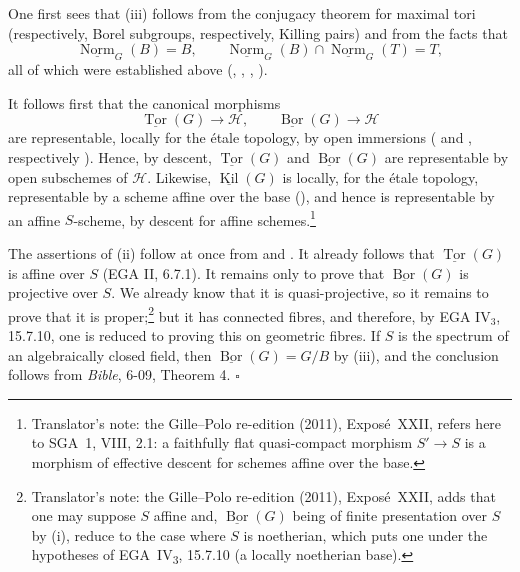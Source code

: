 One first sees that \textup{(iii)} follows from the conjugacy theorem
for maximal tori \textup{(respectively, Borel subgroups, respectively,
Killing pairs)} and from the facts that
\[
  \underline{\operatorname{Norm}}_G(B)=B,
  \qquad
  \underline{\operatorname{Norm}}_G(B)
  \cap
  \underline{\operatorname{Norm}}_G(T)=T,
\]
all of which were established above \textup{(, , ,
)}.

It follows first that the canonical morphisms
\[
  \underline{\operatorname{Tor}}(G)\longrightarrow\mathcal H,
  \qquad
  \underline{\operatorname{Bor}}(G)\longrightarrow\mathcal H
\]
are representable, locally for the étale topology, by open immersions
\textup{( and , respectively )}. Hence, by descent,
\(\underline{\operatorname{Tor}}(G)\) and
\(\underline{\operatorname{Bor}}(G)\) are representable by open
subschemes of \(\mathcal H\). Likewise,
\(\underline{\operatorname{Kil}}(G)\) is locally, for the étale
topology, representable by a scheme affine over the base
\textup{()}, and hence is representable by an affine
\(S\)-scheme, by descent for affine schemes.\footnote{Translator's note: the Gille--Polo re-edition (2011), Exposé~XXII, refers here to SGA~1, VIII, 2.1:
a faithfully flat quasi-compact morphism \(S'\to S\) is a morphism of
effective descent for schemes affine over the base.}

The assertions of \textup{(ii)} follow at once from \textup{}
and . It already follows that
\(\underline{\operatorname{Tor}}(G)\) is affine over \(S\)
\textup{(EGA II, 6.7.1)}. It remains only to prove that
\(\underline{\operatorname{Bor}}(G)\) is projective over \(S\). We
already know that it is quasi-projective, so it remains to prove that
it is proper;\footnote{Translator's note: the Gille--Polo re-edition (2011), Exposé~XXII, adds that one may suppose \(S\)
affine and, \(\underline{\operatorname{Bor}}(G)\) being of finite presentation
over \(S\) by \textup{(i)}, reduce to the case where \(S\) is noetherian, which
puts one under the hypotheses of EGA~IV\textsubscript{3}, 15.7.10 (a locally
noetherian base).} but it has connected fibres, and therefore, by EGA
IV\(_3\), 15.7.10, one is reduced to proving this on geometric fibres.
If \(S\) is the spectrum of an algebraically closed field, then
\(\underline{\operatorname{Bor}}(G)=G/B\) by \textup{(iii)}, and the
conclusion follows from \emph{Bible}, 6-09, Theorem 4.
\hfill\(\square\)

